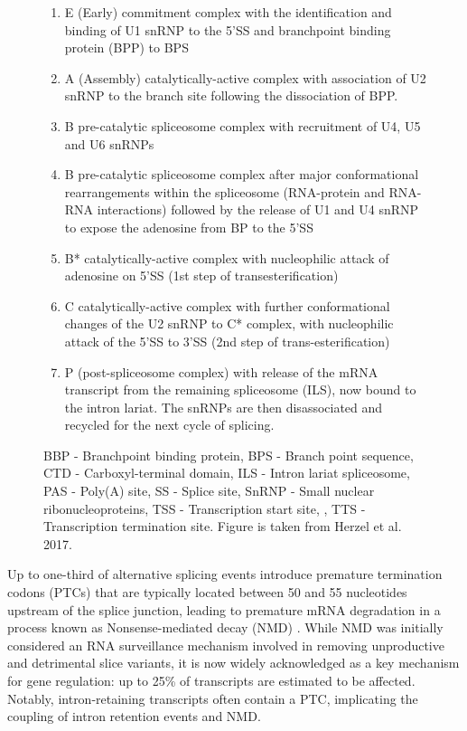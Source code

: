 \begin{figure}[!htp]
{\begin{enumerate}
			\item E (Early) commitment complex with the identification and binding of U1 snRNP to the 5'SS and branchpoint binding protein (BPP) to BPS 
			\item A (Assembly) catalytically-active complex with association of U2 snRNP to the branch site following the dissociation of BPP. 
			\item B pre-catalytic spliceosome complex with recruitment of U4, U5 and U6 snRNPs
			\item B pre-catalytic spliceosome complex after major conformational rearrangements within the spliceosome (RNA-protein and RNA-RNA interactions) followed by the release of U1 and U4 snRNP to expose the adenosine from BP to the 5'SS 
			\item B* catalytically-active complex with nucleophilic attack of adenosine on 5'SS (1st step of transesterification) 
			\item C catalytically-active complex with further conformational changes of the U2 snRNP to C* complex, with nucleophilic attack of the 5'SS to 3'SS (2nd step of trans-esterification) 
			\item P (post-spliceosome complex) with release of the mRNA transcript from the remaining spliceosome (ILS), now bound to the intron lariat. The snRNPs are then disassociated and recycled for the next cycle of splicing.
			\\
		\end{enumerate} 
		BBP - Branchpoint binding protein, BPS - Branch point sequence, CTD - Carboxyl-terminal domain, ILS - Intron lariat spliceosome, PAS - Poly(A) site, SS - Splice site, SnRNP - Small nuclear ribonucleoproteins, TSS - Transcription start site, , TTS - Transcription termination site. Figure is taken from Herzel et al. 2017\cite{Herzel2017}.
	}
	\label{fig:AS_mechanism}
\end{figure}

\newpage
{}
Up to one-third of alternative splicing events introduce premature termination codons (PTCs) that are typically located between 50 and 55 nucleotides upstream of the splice junction, leading to premature mRNA degradation in a process known as Nonsense-mediated decay (NMD)\cite{Lewis2003} . While NMD was initially considered an RNA surveillance mechanism involved in removing unproductive and detrimental slice variants, it is now widely acknowledged as a key mechanism for gene regulation\cite{Nickless2017}: up to 25\% of transcripts are estimated to be affected\cite{Weischenfeldt2012}. Notably, intron-retaining transcripts often contain a PTC, implicating the coupling of intron retention events and NMD\cite{Wong2013}.     

